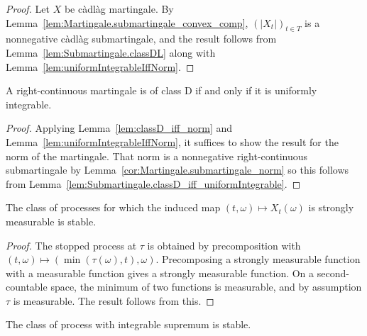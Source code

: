 \begin{proof}  
Let $X$ be càdlàg martingale. By Lemma~\ref{lem:Martingale.submartingale_convex_comp}, $(|X_t|)_{t \in T}$ is a nonnegative càdlàg submartingale, and the result follows from Lemma~\ref{lem:Submartingale.classDL} along with Lemma~\ref{lem:uniformIntegrableIffNorm}.
\end{proof}


\begin{lemma}\label{lem:Martingale.classD_iff_uniformIntegrable}
A right-continuous martingale is of class D if and only if it is uniformly integrable.
\end{lemma}

\begin{proof}  
Applying Lemma~\ref{lem:classD_iff_norm} and Lemma~\ref{lem:uniformIntegrableIffNorm}, it suffices to show the result for the norm of the martingale.
That norm is a nonnegative right-continuous submartingale by Lemma~\ref{cor:Martingale.submartingale_norm} so this follows from Lemma~\ref{lem:Submartingale.classD_iff_uniformIntegrable}.
\end{proof}


\begin{lemma}\label{lem:isStable_stronglyMeasurable_uncurry}
  \leanok
The class of processes for which the induced map $(t,\omega)\mapsto X_t(\omega)$ is strongly measurable is stable.
\end{lemma}

\begin{proof}

\leanok
The stopped process at $\tau$ is obtained by precomposition with $(t, \omega) \mapsto (\min (\tau(\omega), t), \omega)$.
Precomposing a strongly measurable function with a measurable function gives a strongly measurable function.
On a second-countable space, the minimum of two functions is measurable, and by assumption $\tau$ is measurable.
The result follows from this.
\end{proof}


\begin{lemma}\label{lem:isStable_hasIntegrableSup}
  \leanok
The class of process with integrable supremum is stable.
\end{lemma}

